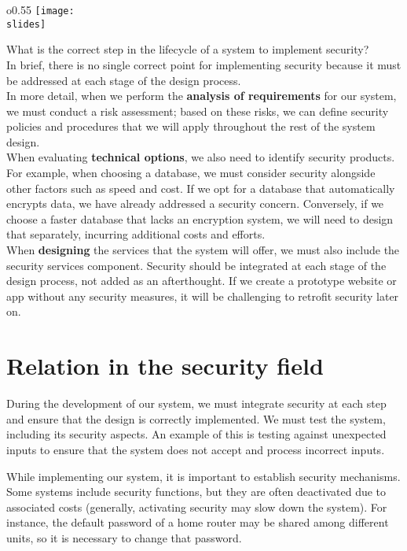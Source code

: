\begin{wrapfigure}{o}{0.55\textwidth}
  \centering
  \texttt{[image: \\slides]}
\end{wrapfigure}
What is the correct step in the lifecycle of a system to implement security?\\
In brief, there is no single correct point for implementing security because it must be addressed at each stage of the design process.\\ 
In more detail, when we perform the \textbf{analysis of requirements} for our system, we must conduct a risk assessment; based on these risks, we can define security policies and procedures that we will apply throughout the rest of the system design.\\ 
When evaluating \textbf{technical options}, we also need to identify security products. For example, when choosing a database, we must consider security alongside other factors such as speed and cost. If we opt for a database that automatically encrypts data, we have already addressed a security concern. Conversely, if we choose a faster database that lacks an encryption system, we will need to design that separately, incurring additional costs and efforts. \\
When \textbf{designing} the services that the system will offer, we must also include the security services component. Security should be integrated at each stage of the design process, not added as an afterthought. If we create a prototype website or app without any security measures, it will be challenging to retrofit security later on.


\section{Relation in the security field}
During the development of our system, we must integrate security at each step and ensure that the design is correctly implemented. We must test the system, including its security aspects. An example of this is testing against unexpected inputs to ensure that the system does not accept and process incorrect inputs.

While implementing our system, it is important to establish security mechanisms. Some systems include security functions, but they are often deactivated due to associated costs (generally, activating security may slow down the system). For instance, the default password of a home router may be shared among different units, so it is necessary to change that password.

